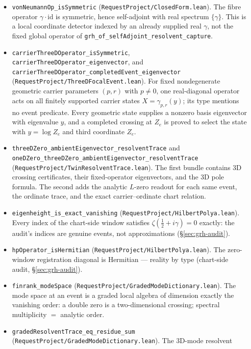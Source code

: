 \documentclass[11pt]{article}
\theoremstyle{definition}
\begin{document}
\begin{itemize}
\item \texttt{vonNeumannOp\_isSymmetric}
(\texttt{RequestProject/ClosedForm.lean}). The fibre operator
\(\gamma\cdot\mathrm{id}\) is symmetric, hence self-adjoint with real
spectrum \(\{\gamma\}\).  This is a local coordinate detector indexed by an
already supplied real \(\gamma\), not the fixed global operator of
\texttt{grh\_of\_selfAdjoint\_resolvent\_capture}.
\item \texttt{carrierThreeDOperator\_isSymmetric},
\texttt{carrierThreeDOperator\_eigenvector}, and
\texttt{carrierThreeDOperator\_completedEvent\_eigenvector}
(\texttt{RequestProject/ThreeDFocalEvent.lean}).  For fixed nondegenerate geometric carrier
parameters $(p,r)$ with $p\ne0$, one real-diagonal operator acts on all finitely supported
carrier states $X=\gamma_{p,r}(y)$; its type mentions no event predicate.
Every geometric state supplies a nonzero basis eigenvector with eigenvalue
$y$, and a completed crossing at $Z_e$ is proved to select the state with
$y=\log Z_e$ and third coordinate $Z_e$.
\item \texttt{threeDZero\_ambientEigenvector\_resolventTrace} and
\texttt{oneDZero\_threeDZero\_ambientEigenvector\_resolventTrace}
(\texttt{RequestProject/TwinResolventTrace.lean}).  The first bundle contains
3D crossing certificates, their fixed-operator eigenvectors, and the 3D pole
formula.  The second adds the analytic \(L\)-zero readout for each same event,
the ordinate trace, and the exact carrier--ordinate chart relation.
\item \texttt{eigenheight\_is\_exact\_vanishing}
(\texttt{RequestProject/HilbertPolya.lean}). Every index of the chart-side
window satisfies \(\zeta(\tfrac12+i\gamma)=0\) exactly: the audit's indices
are genuine events, not approximations (\S\ref{sec:grh-audit}).
\item \texttt{hpOperator\_isHermitian}
(\texttt{RequestProject/HilbertPolya.lean}). The zero-window registration
diagonal is Hermitian --- reality by type (chart-side audit,
\S\ref{sec:grh-audit}).
\item \texttt{finrank\_modeSpace}
(\texttt{RequestProject/GradedModeDictionary.lean}). The mode space at an
event is a graded local algebra of dimension exactly the vanishing order: a
double zero is a two-dimensional crossing; spectral multiplicity \(=\)
analytic order.
\item \texttt{gradedResolventTrace\_eq\_residue\_sum}
(\texttt{RequestProject/GradedModeDictionary.lean}). The 3D-mode resolvent

\end{itemize}
\end{document}
